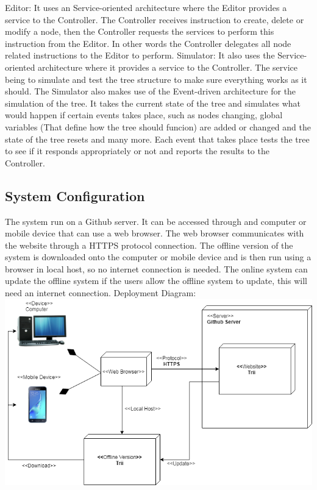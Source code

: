 \documentclass{article}
\begin{document}
    Editor: It uses an Service-oriented architecture where the Editor provides a service to the Controller. The Controller receives instruction to create, delete or modify a node, then the Controller requests the services to perform this instruction from the Editor. In other words the Controller delegates all node related instructions to the Editor to perform.\newline \newline 
    Simulator: It also uses the Service-oriented architecture where it provides a service to the Controller. The service being to simulate and test the tree structure to make sure everything works as it should. The Simulator also makes use of the Event-driven architecture for the simulation of the tree. It takes the current state of the tree and simulates what would happen if certain events takes place, such as nodes changing, global variables (That define how the tree should funcion) are added or changed and the state of the tree resets and many more. Each event that takes place tests the tree to see if it responds appropriately or not and reports the results to the Controller.

  \subsection{System Configuration} 
    The system run on a Github server. It can be accessed through and computer or mobile device that can use a web browser. The web browser communicates with the website through a HTTPS protocol connection. The offline version of the system is downloaded onto the computer or mobile device and is then run using a browser in local host, so no internet connection is needed. The online system can update the offline system if the users allow the offline system to update, this will need an internet connection.\newline \newline 
    Deployment Diagram:
    \includegraphics[width=\textwidth]{TriiDeploymentDiagram}
\end{document}
